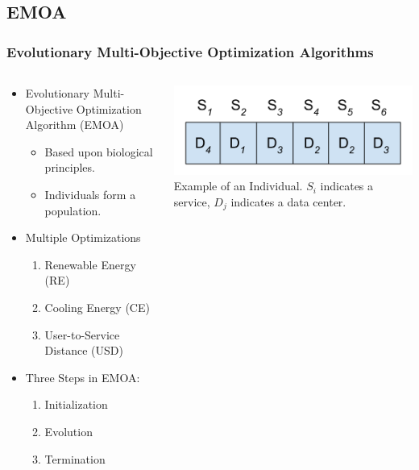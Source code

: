 \documentclass{beamer}
\begin{document}
\subsection{EMOA}
\begin{frame}
  \frametitle{Evolutionary Multi-Objective Optimization Algorithms}
\begin{columns}
\begin{column}{0.65\textwidth}
  \begin{itemize}
 		\item Evolutionary Multi-Objective Optimization Algorithm (EMOA)
 		\begin{itemize}
 			\item Based upon biological principles.
 			\item Individuals form a population.
 		\end{itemize}
	\item Multiple Optimizations
 		\begin{enumerate}
			\item Renewable Energy (RE)
			\item Cooling Energy (CE)
			\item User-to-Service Distance (USD)
		\end{enumerate}
	\item Three Steps in EMOA: 
		\begin{enumerate}
			\item Initialization
			\item Evolution
			\item Termination
		\end{enumerate}
  \end{itemize}
\end{column}
\begin{column}{0.35\textwidth}
\includegraphics[width=.95\textwidth]{Individual.png} \\
\tiny{Example of an Individual. $S_i$ indicates a service, $D_j$ indicates a data center.}
\linebreak
\linebreak
\linebreak

\end{column}
\end{columns}


\end{frame}
 	
\end{document}
